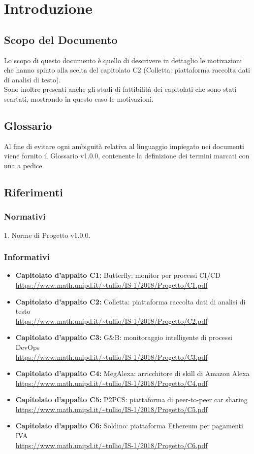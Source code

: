 \section{Introduzione}
\subsection{Scopo del Documento}
Lo scopo di questo documento è quello di descrivere in dettaglio le motivazioni che hanno spinto alla scelta del capitolato C2 (Colletta: piattaforma raccolta dati di analisi di testo).\\ Sono inoltre presenti anche gli studi di fattibilità dei capitolati che sono stati scartati, mostrando in questo caso le motivazioni.
	
\subsection{Glossario}
Al fine di evitare ogni ambiguità relativa al linguaggio impiegato nei documenti viene
fornito il Glossario v1.0.0, contenente la definizione dei termini marcati con
una a pedice.
	
\subsection{Riferimenti}

\subsubsection{Normativi}
1. Norme di Progetto v1.0.0.
	
\subsubsection{Informativi}
\begin{itemize}
\item \textbf{Capitolato d’appalto C1:} Butterfly: monitor per processi CI/CD\\
\url{https://www.math.unipd.it/~tullio/IS-1/2018/Progetto/C1.pdf}
\item \textbf{Capitolato d’appalto C2:} Colletta: piattaforma raccolta dati di analisi di testo\\
\url{https://www.math.unipd.it/~tullio/IS-1/2018/Progetto/C2.pdf}
\item \textbf{Capitolato d’appalto C3:} G\&{B}: monitoraggio intelligente di processi DevOps\\
\url{https://www.math.unipd.it/~tullio/IS-1/2018/Progetto/C3.pdf}
\item \textbf{Capitolato d’appalto C4:} MegAlexa: arricchitore di skill di Amazon Alexa\\
\url{https://www.math.unipd.it/~tullio/IS-1/2018/Progetto/C4.pdf}
\item \textbf{Capitolato d’appalto C5:} P2PCS: piattaforma di peer-to-peer car sharing	\\
\url{https://www.math.unipd.it/~tullio/IS-1/2018/Progetto/C5.pdf}
\item \textbf{Capitolato d’appalto C6:} Soldino: piattaforma Ethereum per pagamenti IVA\\
\url{https://www.math.unipd.it/~tullio/IS-1/2018/Progetto/C6.pdf}
\end{itemize}
